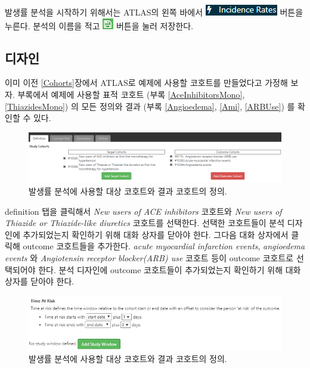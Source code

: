\documentclass[11pt]{book}
\theoremstyle{definition}
\theoremstyle{definition}
\theoremstyle{definition}
\theoremstyle{remark}
\begin{document}
발생률 분석을 시작하기 위해서는 ATLAS의 왼쪽 바에서
\includegraphics{images/Characterization/atlasIncidenceMenuItem.png}
버튼을 누른다. 분석의 이름을 적고
\includegraphics{images/PopulationLevelEstimation/save.png} 버튼을 눌러
저장한다.

\subsection{디자인}\label{-1}

이미 이전 \ref{Cohorts}장에서 ATLAS로 예제에 사용할 코호트를 만들었다고
가정해 보자. 부록에서 예제에 사용할 표적 코호트 (부록
\ref{AceInhibitorsMono}, \ref{ThiazidesMono}) 의 모든 정의와 결과 (부록
\ref{Angioedema}, \ref{Ami}, \ref{ARBUse}) 를 확인할 수 있다.

\begin{figure}

{\centering \includegraphics[width=1\linewidth]{images/Characterization/atlasIncidenceCohortSelection} 

}

\caption{발생률 분석에 사용할 대상 코호트와 결과 코호트의 정의.}\label{fig:atlasIncidenceCohortSelection}
\end{figure}

definition 탭을 클릭해서 \emph{New users of ACE inhibitors} 코호트와
\emph{New users of Thiazide or Thiazide-like diuretics} 코호트를
선택한다. 선택한 코호트들이 분석 디자인에 추가되었는지 확인하기 위해
대화 상자를 닫아야 한다. 그다음 대화 상자에서 클릭해 outcome 코호트들을
추가한다. \emph{acute myocardial infarction events}, \emph{angioedema
events} 와 \emph{Angiotensin receptor blocker(ARB) use} 코호트 등이
outcome 코호트로 선택되어야 한다. 분석 디자인에 outcome 코호트들이
추가되었는지 확인하기 위해 대화 상자를 닫아야 한다.

\begin{figure}

{\centering \includegraphics[width=1\linewidth]{images/Characterization/atlasIncidenceTimeAtRisk} 

}

\caption{발생률 분석에 사용할 대상 코호트와 결과 코호트의 정의.}\label{fig:atlasIncidenceTimeAtRisk}
\end{figure}
\end{document}

